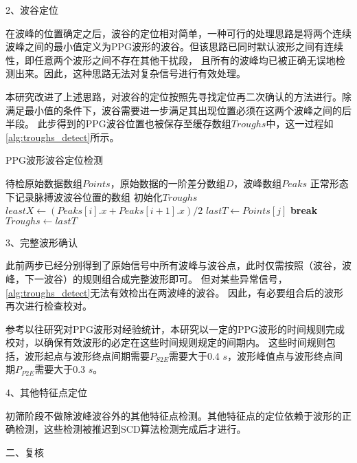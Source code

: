 2、波谷定位

在波峰的位置确定之后，波谷的定位相对简单，一种可行的处理思路是将两个连续波峰之间的最小值定义为PPG波形的波谷。但该思路已同时默认波形之间有连续性，即任意两个波形之间不存在其他干扰段，
且所有的波峰均已被正确无误地检测出来。因此，这种思路无法对复杂信号进行有效处理。

本研究改进了上述思路，对波谷的定位按照先寻找定位再二次确认的方法进行。除满足最小值的条件下，波谷需要进一步满足其出现位置必须在这两个波峰之间的后半段。
此步得到的PPG波谷位置也被保存至缓存数组$Troughs$中，这一过程如\autoref{alg:troughs_detect}所示。
\begin{breakablealgorithm}
    \caption{PPG波形波谷定位检测}
    \label{alg:troughs_detect}
    \begin{algorithmic}[1] %
        \Require 待检原始数据数组$Points$，原始数据的一阶差分数组$D$，波峰数组$Peaks$
        \Ensure 正常形态下记录脉搏波波谷位置的数组
            \State 初始化$Troughs$
                \State $leastX \gets (Peaks[i].x + Peaks[i+1].x )/2$
                            \State $lastT \gets Points[j]$
                            \State \textbf{break}
                        \EndIf
                    \EndFor
                \State $Troughs \gets lastT$
            \EndFor
            \State {}
        \EndFunction
    \end{algorithmic}
\end{breakablealgorithm}

3、完整波形确认

此前两步已经分别得到了原始信号中所有波峰与波谷点，此时仅需按照（波谷，波峰，下一波谷）的规则组合成完整波形即可。
但对某些异常信号，\autoref{alg:troughs_detect}无法有效检出在两波峰的波谷。
因此，有必要组合后的波形再次进行检查校对。

参考以往研究对PPG波形对经验统计，本研究以一定的PPG波形的时间规则完成校对，以确保有效波形的必定在这些时间规则规定的间期内。
这些时间规则包括，波形起点与波形终点间期需要$P_{S2E}$需要大于0.4 $s$，波形峰值点与波形终点间期$P_{P2E}$需要大于0.3 $s$。

4、其他特征点定位

初筛阶段不做除波峰波谷外的其他特征点检测。其他特征点的定位依赖于波形的正确检测，这些检测被推迟到SCD算法检测完成后才进行。

二、复核

